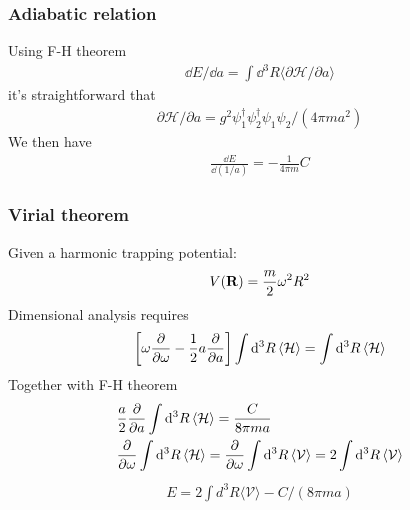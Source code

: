 \begin{frame}
	\frametitle{Adiabatic relation}

	Using F-H theorem
	\begin{align}
		\dd E / \dd a = \int \dd^{3} R \langle \partial \mathcal{H} / \partial a \rangle
	\end{align}
	it's straightforward that
	\begin{align}
		\partial \mathcal{H} / \partial a = g^{2} \psi_{1}^{\dagger} \psi_{2}^{\dagger} \psi_{1} \psi_{2} / (4 \pi m a^{2})
	\end{align}
	We then have
	\begin{align}
		\frac {\dd E} {\dd (1 / a)} = - \frac {1} {4 \pi m} C
	\end{align}

\end{frame}
\begin{frame}
	\frametitle{Virial theorem}

	Given a harmonic trapping potential:
	\begin{align}
		V(\vb{R})=\frac{m}{2}\omega^2R^2
	\end{align}
	Dimensional analysis requires
	\begin{align}
		\bqty{\omega\pdv{\omega}-\frac{1}{2}a\pdv{a}}\int\dd^3R\expval{\mathcal{H}}=\int\dd^3R\expval{\mathcal{H}}
	\end{align}
	Together with F-H theorem
	\begin{align}
		  & \frac{a}{2}\pdv{a}\int\dd^3R\expval{\mathcal{H}}=\frac{C}{8\pi m a}                                                   \\
		  & \pdv{\omega}\int\dd^3R\expval{\mathcal{H}}=\pdv{\omega}\int\dd^3R\expval{\mathcal{V}}=2\int\dd^3R\expval{\mathcal{V}}
	\end{align}
	\begin{align}
		E=2 \int d^{3} R\langle\mathcal{V}\rangle-C /(8 \pi m a)
	\end{align}

\end{frame}

